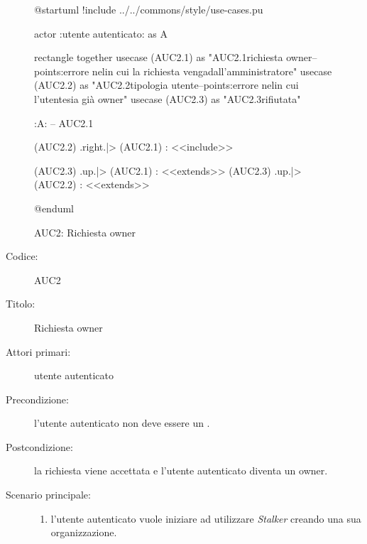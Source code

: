 \documentclass[../../../analisi-dei-requisiti.tex]{subfiles}
\begin{document}
\begin{figure}[h!]
  \centering
  \begin{plantuml}
  @startuml
  !include ../../commons/style/use-cases.pu

  actor :utente autenticato: as A

  rectangle {
    together {
      usecase (AUC2.1) as "AUC2.1\nInvio richiesta owner\n--\nExtension points:\nVisualizzazione errore nel\ncaso in cui la richiesta venga\nrifiutata dall'amministratore"
      usecase (AUC2.2) as "AUC2.2\nVerifica tipologia utente\n--\nExtension points:\nVisualizzazione errore nel\ncaso in cui l'utente\nautenticato sia già owner"
    }
      usecase (AUC2.3) as "AUC2.3\nRichiesta rifiutata"
    }

  :A: -- AUC2.1

  (AUC2.2) .right.|> (AUC2.1) : <<include>>

  (AUC2.3) .up.|> (AUC2.1) : <<extends>>
  (AUC2.3) .up.|> (AUC2.2) : <<extends>>

  @enduml
  \end{plantuml}
  \caption{AUC2: Richiesta owner}
  \label{fig:auc2}
\end{figure}

\begin{description}
  \item[Codice:] AUC2
  \item[Titolo:] Richiesta owner
  \item[Attori primari:] utente autenticato
  \item[Precondizione:] l'utente autenticato non deve essere un .
  \item[Postcondizione:] la richiesta viene accettata e l'utente autenticato diventa un owner.
  \item[Scenario principale:]
  \begin{enumerate}
    \item l'utente autenticato vuole iniziare ad utilizzare \emph{Stalker} creando una sua organizzazione.
  \end{enumerate}
\end{description}
\end{document}
